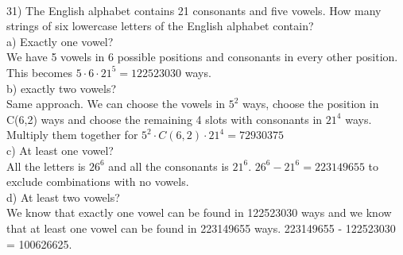 \documentclass{article}
\begin{document}
\begin{flushleft}
~\\
\setlength\parindent{0pt}31) The English alphabet contains 21 consonants and five vowels.  How many strings of six lowercase letters of the English alphabet contain? \\
\setlength\parindent{24pt}a) Exactly one vowel? \\
\setlength\parindent{48pt} We have 5 vowels in 6 possible positions and consonants in every other position.  This becomes $5 \cdot 6 \cdot 21^5 = 122523030$ ways.\\
\setlength\parindent{24pt}b) exactly two vowels?  \\
\setlength\parindent{48pt}Same approach.  We can choose the vowels in $5^2$ ways, choose the position in C(6,2) ways and choose the remaining 4 slots with consonants in $21^4$ ways.  Multiply them together for $5^2 \cdot C(6,2) \cdot 21^4 = 72930375$ \\
\setlength\parindent{24pt}c) At least one vowel?\\
\setlength\parindent{48pt} All the letters is $26^6$ and all the consonants is $21^6$.  $26^6 - 21^6 = 223149655$ to exclude combinations with no vowels. \\
\setlength\parindent{24pt}d) At least two vowels? \\
\setlength\parindent{48pt} We know that exactly one vowel can be found in 122523030 ways and we know that at least one vowel can be found in 223149655 ways.  223149655 - 122523030 = 100626625.


\end{flushleft}
\end{document}
